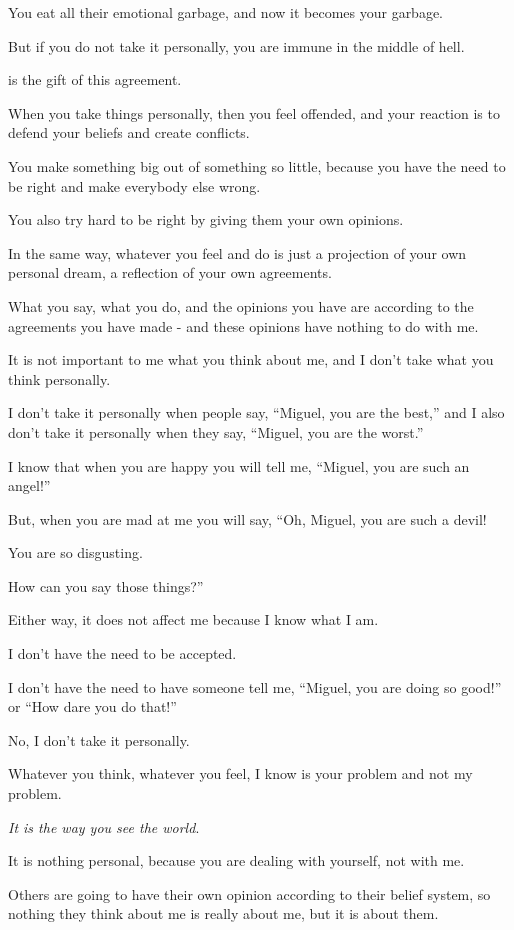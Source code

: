 \documentclass{article}
\numberwithin{equation}{section}
\begin{document}
%
You eat all their emotional garbage, and now it becomes your garbage.

But if you do not take it personally, you are immune in the middle of hell.

 is the gift of this agreement.

%
When you take things personally, then you feel offended, and your reaction is to defend your beliefs and create conflicts.

You make something big out of something so little, because you have the need to be right and make everybody else wrong.

You also try hard to be right by giving them your own opinions.

In the same way, whatever you feel and do is just a projection of your own personal dream, a reflection of your own agreements.

What you say, what you do, and the opinions you have are according to the agreements you have made - and these opinions have nothing to do with me.

%
It is not important to me what you think about me, and I don't take what you think personally.

I don't take it personally when people say, ``Miguel, you are the best,'' and I also don't take it personally when they say, ``Miguel, you are the worst.''

I know that when you are happy you will tell me, ``Miguel, you are such an angel!''

But, when you are mad at me you will say, ``Oh, Miguel, you are such a devil!

You are so disgusting.

How can you say those things?''

Either way, it does not affect me because I know what I am.

I don't have the need to be accepted.

I don't have the need to have someone tell me, ``Miguel, you are doing so good!'' or ``How dare you do that!''

%
No, I don't take it personally.

Whatever you think, whatever you feel, I know is your problem and not my problem.

\textit{It is the way you see the world}.

It is nothing personal, because you are dealing with yourself, not with me.

Others are going to have their own opinion according to their belief system, so nothing they think about me is really about me, but it is about them.
\end{document}
